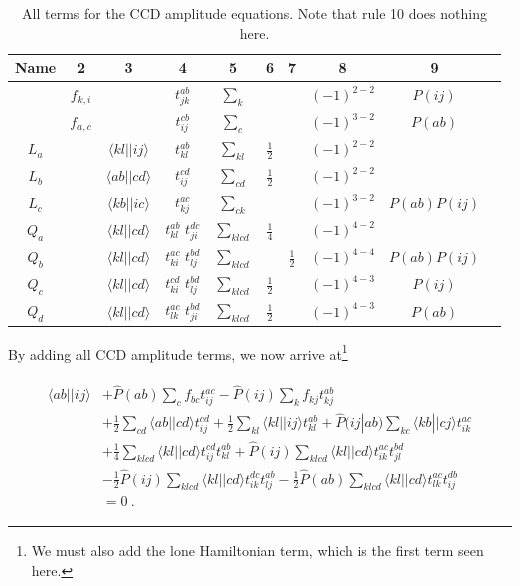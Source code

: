 \documentclass[10pt,twoside]{report}
\begin{document}
	\begin{table}[h]
	\centering
	\caption{All terms for the CCD amplitude equations. Note that rule 10 does nothing here.}
	\begin{tabular}{cccccccccc}
		Name & 2 & 3 & 4 & 5 & 6 & 7 & 8 & 9 & \\ \hline
		& $f_{k,i}$ &  & $t_{jk}^{ab}$ & $\sum_{k}$ &  &  & $(-1)^{2-2}$ & $P(ij)$ &\\
		& $f_{a,c}$ &  & $t_{ij}^{cb}$ & $\sum_{c}$ &  &  & $(-1)^{3-2}$ & $P(ab)$ &\\
		$L_a$ & & $\langle kl||ij \rangle$ & $t_{kl}^{ab}$ & $\sum_{kl}$ & $\frac{1}{2}$ &  & $(-1)^{2-2}$ &  &\\
		$L_b$ & & $\langle ab||cd \rangle$ & $t_{ij}^{cd}$ & $\sum_{cd}$ & $\frac{1}{2}$ &  & $(-1)^{2-2}$ &  &\\
		$L_c$ & & $\langle kb||ic \rangle$ & $t_{kj}^{ac}$ & $\sum_{ck}$ &  &  & $(-1)^{3-2}$ & $P(ab)P(ij)$ &\\
		$Q_a$ & & $\langle kl||cd \rangle$ & $t_{kl}^{ab}$ $t_{ji}^{dc}$ & $\sum_{klcd}$ & $\frac{1}{4}$ &  & $(-1)^{4-2}$ &  &\\
		$Q_b$ & & $\langle kl||cd \rangle$ & $t_{ki}^{ac}$ $t_{lj}^{bd}$ & $\sum_{klcd}$ &  & $\frac{1}{2}$ & $(-1)^{4-4}$ & $P(ab)P(ij)$ &\\
		$Q_c$ & & $\langle kl||cd \rangle$ & $t_{ki}^{cd}$ $t_{lj}^{bd}$ & $\sum_{klcd}$ & $\frac{1}{2}$ &  & $(-1)^{4-3}$ & $P(ij)$ &\\
		$Q_d$ & & $\langle kl||cd \rangle$ & $t_{lk}^{ac}$ $t_{ji}^{bd}$ & $\sum_{klcd}$ & $\frac{1}{2}$ &  & $(-1)^{4-3}$ & $P(ab)$ &\\ \hline
	\end{tabular}
	\label{CC | table | "CCD amp eq derivation"}
	\end{table}
	
	By adding all CCD amplitude terms, we now arrive at\footnote{We must also add the lone Hamiltonian term, which is the first term seen here.}
	
	\begin{align}
		\begin{split}
		\langle ab||ij\rangle &+ \hat{P}(ab)\sum_{c}f_{bc}t_{ij}^{ac} - \hat{P}(ij)\sum_{k}f_{kj}t_{kj}^{ab}\\
		&+ \frac{1}{2}\sum_{cd}\langle ab||cd\rangle t_{ij}^{cd} + \frac{1}{2}\sum_{kl}\langle kl||ij\rangle t_{kl}^{ab} + \hat{P}(ij|ab)\sum_{kc}\langle kb||cj\rangle t_{ik}^{ac}\\
		&+ \frac{1}{4}\sum_{klcd}\langle kl||cd\rangle t_{ij}^{cd}t_{kl}^{ab} + \hat{P}(ij)\sum_{klcd}\langle kl||cd\rangle t_{ik}^{ac}t_{jl}^{bd}\\
		&- \frac{1}{2}\hat{P}(ij)\sum_{klcd}\langle kl||cd\rangle t_{ik}^{dc}t_{lj}^{ab} - \frac{1}{2}\hat{P}(ab)\sum_{klcd}\langle kl||cd\rangle t_{lk}^{ac}t_{ij}^{db}\\
		&= 0\:.
		\end{split}
	\end{align}
	
\end{document}
